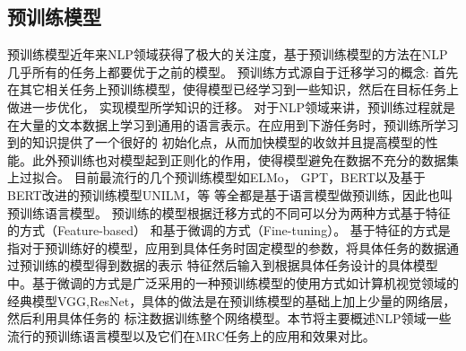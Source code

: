 \subsection{预训练模型}
预训练模型近年来NLP领域获得了极大的关注度，基于预训练模型的方法在NLP几乎所有的任务上都要优于之前的模型。
预训练方式源自于迁移学习的概念: 首先在其它相关任务上预训练模型，使得模型已经学习到一些知识，然后在目标任务上做进一步优化，
实现模型所学知识的迁移。
对于NLP领域来讲，预训练过程就是在大量的文本数据上学习到通用的语言表示。在应用到下游任务时，预训练所学习到的知识提供了一个很好的
初始化点，从而加快模型的收敛并且提高模型的性能。此外预训练也对模型起到正则化的作用，使得模型避免在数据不充分的数据集上过拟合。
目前最流行的几个预训练模型如ELMo\cite{ELMo}，
GPT\cite{GPT}，BERT\cite{BERT}以及基于BERT改进的预训练模型UNILM，等
等全都是基于语言模型做预训练，因此也叫预训练语言模型。
预训练的模型根据迁移方式的不同可以分为两种方式基于特征的方式（Feature-based）
和基于微调的方式（Fine-tuning）。
基于特征的方式是指对于预训练好的模型，应用到具体任务时固定模型的参数，将具体任务的数据通过预训练的模型得到数据的表示
特征然后输入到根据具体任务设计的具体模型中。基于微调的方式是广泛采用的一种预训练模型的使用方式如计算机视觉领域的
经典模型VGG,ResNet，具体的做法是在预训练模型的基础上加上少量的网络层，然后利用具体任务的
标注数据训练整个网络模型。本节将主要概述NLP领域一些流行的预训练语言模型以及它们在MRC任务上的应用和效果对比。

